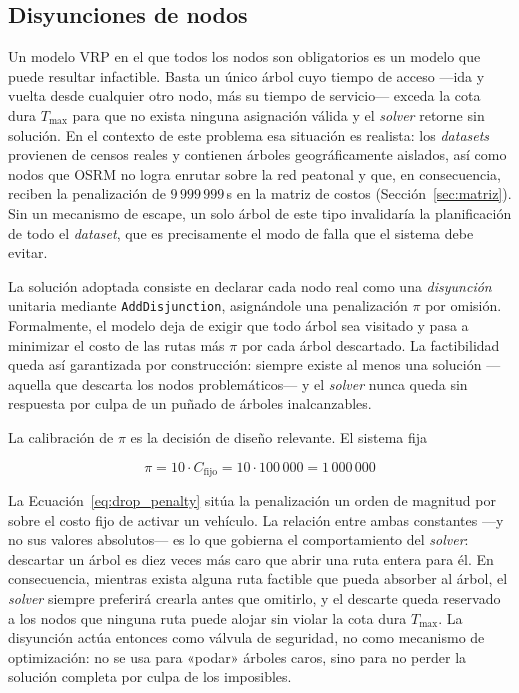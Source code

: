 \subsection{Disyunciones de nodos}
\label{sec:disyunciones}

Un modelo VRP en el que todos los nodos son obligatorios es un modelo que puede
resultar infactible. Basta un único árbol cuyo tiempo de acceso ---ida y
vuelta desde cualquier otro nodo, más su tiempo de servicio--- exceda la cota dura
$T_{\max}$ para que no exista ninguna asignación válida y el \textit{solver} retorne sin
solución. En el contexto de este problema esa situación es realista: los
\textit{datasets} provienen de censos reales y contienen árboles geográficamente
aislados, así como nodos que OSRM no logra enrutar sobre la red peatonal y que, en
consecuencia, reciben la penalización de $9\,999\,999$\,s en la matriz de costos
(Sección~\ref{sec:matriz}). Sin un mecanismo de escape, un solo árbol de este tipo invalidaría
la planificación de todo el \textit{dataset}, que es precisamente el modo de falla
que el sistema debe evitar.

La solución adoptada consiste en declarar cada nodo real como una
\textit{disyunción} unitaria mediante \texttt{AddDisjunction}, asignándole una
penalización $\pi$ por omisión. Formalmente, el modelo deja de exigir que todo árbol
sea visitado y pasa a minimizar el costo de las rutas más $\pi$ por cada árbol
descartado. La factibilidad queda así garantizada por construcción: siempre existe
al menos una solución ---aquella que descarta los nodos problemáticos--- y el \textit{solver}
nunca queda sin respuesta por culpa de un puñado de árboles inalcanzables.

La calibración de $\pi$ es la decisión de diseño relevante. El sistema fija

\begin{equation}
  \pi = 10 \cdot C_{\text{fijo}} = 10 \cdot 100\,000 = 1\,000\,000
  \label{eq:drop_penalty}
\end{equation}

La Ecuación~\ref{eq:drop_penalty} sitúa la penalización un orden de magnitud por
sobre el costo fijo de activar un vehículo. La
relación entre ambas constantes ---y no sus valores absolutos--- es lo que gobierna
el comportamiento del \textit{solver}: descartar un árbol es diez veces más caro que abrir una
ruta entera para él. En consecuencia, mientras exista alguna ruta factible que pueda
absorber al árbol, el \textit{solver} siempre preferirá crearla antes que omitirlo, y el
descarte queda reservado a los nodos que ninguna ruta puede alojar sin violar la cota
dura $T_{\max}$. La disyunción actúa entonces como válvula de seguridad, no como
mecanismo de optimización: no se usa para «podar» árboles caros, sino para no perder
la solución completa por culpa de los imposibles.


